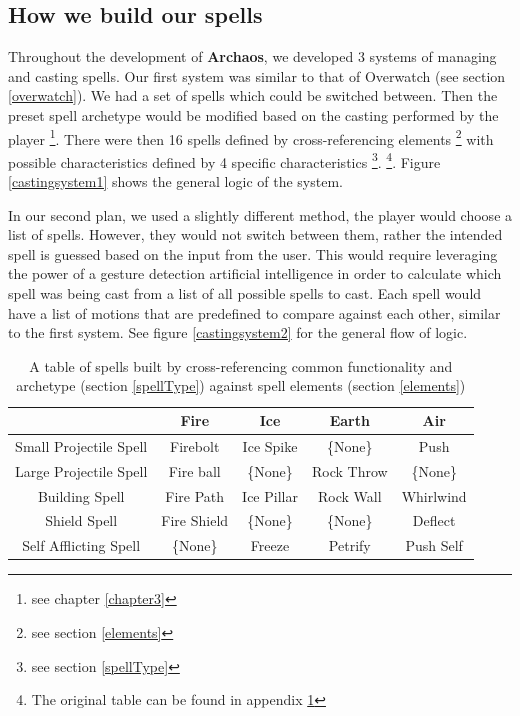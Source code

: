 \documentclass[12pt,a4paper]{report}
\begin{document}
\subsection{How we build our spells} \label{method2}

Throughout the development of \textbf{Archaos}, we developed 3 systems of managing and casting spells. Our first system was similar to that of Overwatch (see section \ref{overwatch}). We had a set of spells which could be switched between. Then the preset spell archetype would be modified based on the casting performed by the player \footnote{see  chapter \ref{chapter3}}. There were then 16 spells defined by cross-referencing elements \footnote{see section \ref{elements}} with possible characteristics defined by 4 specific characteristics \footnote{see section \ref{spellType}}. \footnote{The original table can be found in appendix \ref{spellTable}}. Figure \ref{castingsystem1} shows the general logic of the system.

In our second plan, we used a slightly different method, the player would choose a list of spells. However, they would not switch between them, rather the intended spell is guessed based on the input from the user. This would require leveraging the power of a gesture detection artificial intelligence in order to calculate which spell was being cast from a list of all possible spells to cast. Each spell would have a list of motions that are predefined to compare against each other, similar to the first system. See figure \ref{castingsystem2} for the general flow of logic.

\begin{table}[H]
    \begin{tabular}{|c|c|c|c|c|}
        \hline
                               & Fire        & Ice        & Earth      & Air       \\
        \hline
        Small Projectile Spell & Firebolt    & Ice Spike  & \{None\}   & Push      \\
        Large Projectile Spell & Fire ball   & \{None\}   & Rock Throw & \{None\}  \\
        Building Spell         & Fire Path   & Ice Pillar & Rock Wall  & Whirlwind \\
        Shield Spell           & Fire Shield & \{None\}   & \{None\}   & Deflect   \\
        Self Afflicting Spell  & \{None\}    & Freeze     & Petrify    & Push Self \\
        \hline
    \end{tabular}
    \caption{A table of spells built by cross-referencing common functionality and archetype (section \ref{spellType}) against spell elements (section \ref{elements})}
    \label{spellTable}
\end{table}
\end{document}
